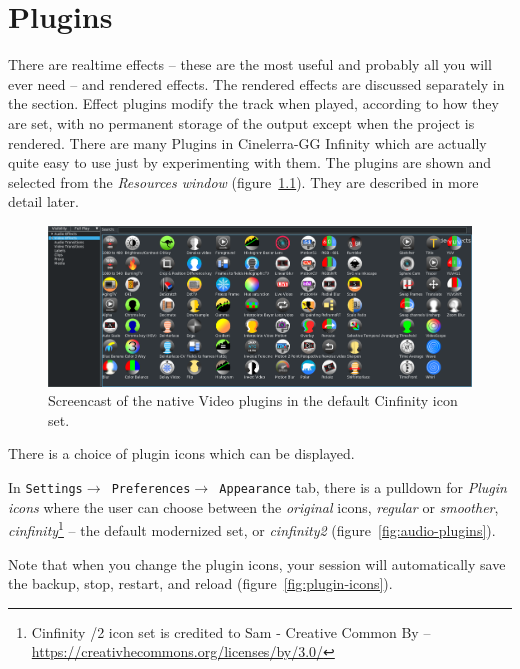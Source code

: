 \chapter{Plugins}%
\label{cha:plugins}

There are realtime effects -- these are the most useful and probably all you will ever need -- and rendered effects. 
The rendered effects are discussed separately in the   section. 
Effect plugins modify the track when played, according to how they are set, with no permanent storage of the output except when the project is rendered. There are many Plugins in Cinelerra-GG Infinity which are actually quite easy to use just by experimenting with them. The plugins are shown and selected from the \textit{Resources window} (figure~\ref{fig:video-plugins}). They are described in more detail later.

\begin{figure}[htpb]
    \centering
    \includegraphics[width=1.0\linewidth]{images/video-plugins.png}
    \caption{Screencast of the native Video plugins in the default Cinfinity icon set.}
    \label{fig:video-plugins}
\end{figure}

There is a choice of plugin icons which can be displayed.

In \texttt{Settings$\rightarrow$ Preferences$\rightarrow$ Appearance} tab, there is a pulldown for \textit{Plugin icons} where the user can choose between the \textit{original} icons, \textit{regular} or \textit{smoother}, \textit{cinfinity}\protect\footnote{Cinfinity /2 icon set is credited to Sam - Creative Common By -- \url{https://creativhecommons.org/licenses/by/3.0/}} -- the default modernized set, or \textit{cinfinity2} (figure~\ref{fig:audio-plugins}).

Note that when you change the plugin icons, your session will automatically save the backup, stop, restart, and reload (figure~\ref{fig:plugin-icons}).


